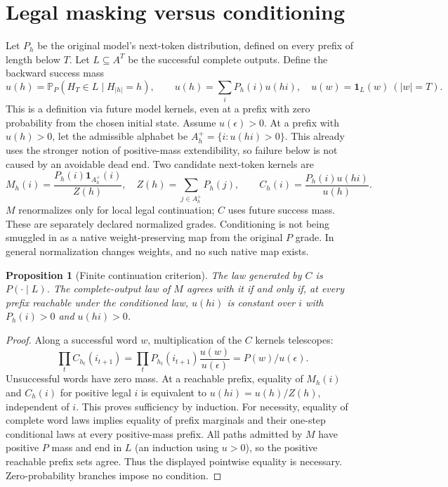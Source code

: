 \documentclass[11pt]{article}
\newtheorem{proposition}{Proposition}
\newcommand{\Prb}{\mathbb P}
\begin{document}
\section{Legal masking versus conditioning}
Let $P_h$ be the original model's next-token distribution, defined on every
prefix of length below $T$. Let $L\subseteq A^T$ be the successful complete
outputs. Define the backward success mass
\[
 u(h)=\Prb_P(H_T\in L\mid H_{|h|}=h),\qquad
 u(h)=\sum_i P_h(i)u(hi),\quad u(w)=\mathbf1_L(w)\ (|w|=T).
\]
This is a definition via future model kernels, even at a prefix with zero
probability from the chosen initial state. Assume $u(\epsilon)>0$.
At a prefix with $u(h)>0$, let the admissible alphabet be
$A_h^+=\{i:u(hi)>0\}$. This already uses the stronger notion of positive-mass
extendibility, so failure below is not caused by an avoidable dead end.
Two candidate next-token kernels are
\[
 M_h(i)=\frac{P_h(i)\mathbf1_{A_h^+}(i)}{Z(h)},\quad
 Z(h)=\sum_{j\in A_h^+}P_h(j),\qquad
 C_h(i)=\frac{P_h(i)u(hi)}{u(h)}.
\]
$M$ renormalizes only for local legal continuation; $C$ uses future success
mass. These are separately declared normalized grades. Conditioning is not
being smuggled in as a native weight-preserving map from the original $P$ grade.
In general normalization changes weights, and no such native map exists.

\begin{proposition}[Finite continuation criterion]
The law generated by $C$ is $P(\cdot\mid L)$. The complete-output law of $M$
agrees with it if and only if, at every prefix reachable under the conditioned
law, $u(hi)$ is constant over $i$ with $P_h(i)>0$ and $u(hi)>0$.
\end{proposition}
\begin{proof}
Along a successful word $w$, multiplication of the $C$ kernels telescopes:
\[
 \prod_t C_{h_t}(i_{t+1})=
 \prod_t P_{h_t}(i_{t+1})\frac{u(w)}{u(\epsilon)}
 =P(w)/u(\epsilon).
\]
Unsuccessful words have zero mass. At a reachable prefix, equality of
$M_h(i)$ and $C_h(i)$ for positive legal $i$ is equivalent to
$u(hi)=u(h)/Z(h)$, independent of $i$. This proves sufficiency by induction.
For necessity, equality of complete word laws implies equality of prefix
marginals and their one-step conditional laws at every positive-mass prefix.
All paths admitted by $M$ have positive $P$ mass and end in $L$ (an induction
using $u>0$), so the positive reachable prefix sets agree. Thus the displayed
pointwise equality is necessary. Zero-probability branches impose no condition.
\end{proof}
\end{document}
